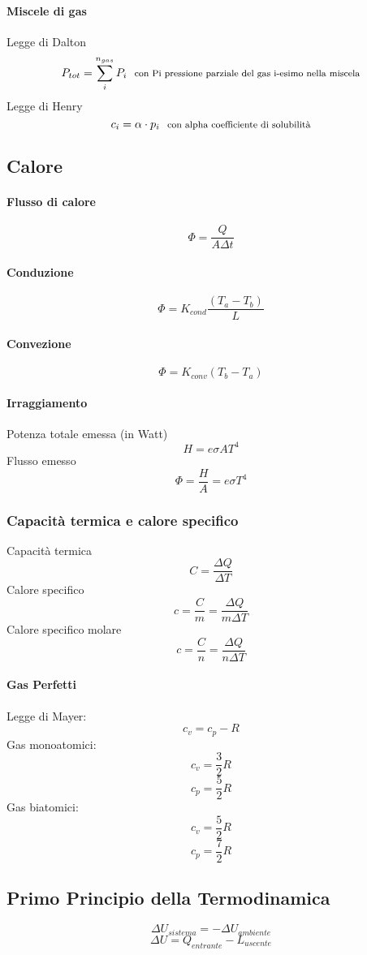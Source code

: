 \documentclass[12pt]{article}
\begin{document}
        \paragraph*{Miscele di gas}
        Legge di Dalton
        \[P_{tot} = \sum_{i}^{n_{gas}}{P_i} \:\:\:\text{\footnotesize{con Pi pressione parziale del gas i-esimo nella miscela}}\]
        Legge di Henry
        \[c_i = \alpha \cdot p_i \:\:\:\text{\footnotesize{con alpha coefficiente di solubilità}}\]
    \newpage
        \subsection{Calore}
        \paragraph*{Flusso di calore}
        \[\Phi = \frac{Q}{A\Delta t}\]
        \paragraph*{Conduzione}
        \[\Phi = K_{cond}\frac{(T_a - T_b)}{L}\]
        \paragraph*{Convezione}
        \[\Phi = K_{conv} (T_b - T_a)\]
        \paragraph*{Irraggiamento}
        Potenza totale emessa (in Watt)
        \[H = e\sigma A T^4\]
        Flusso emesso
        \[\Phi = \frac{H}{A} = e\sigma T^4\]
        \subsubsection{Capacità termica e calore specifico}
        Capacità termica
        \[C = \frac{\Delta Q}{\Delta T}\]
        Calore specifico
        \[c = \frac{C}{m} = \frac{\Delta Q}{m \Delta T}\]
        Calore specifico molare
        \[c = \frac{C}{n} = \frac{\Delta Q}{n \Delta T}\]
        \paragraph*{Gas Perfetti}
        Legge di Mayer:
        \[c_v = c_p - R\]
        Gas monoatomici:
        \[c_v = \frac{3}{2} R\]
        \[c_p = \frac{5}{2} R\]
        Gas biatomici:
        \[c_v = \frac{5}{2} R\]
        \[c_p = \frac{7}{2} R\]
    \subsection{Primo Principio della Termodinamica}
        \[\Delta U_{sistema} = -\Delta U_{ambiente}\]
        \[\Delta U = Q_{entrante} - L_{uscente}\]
\end{document}
